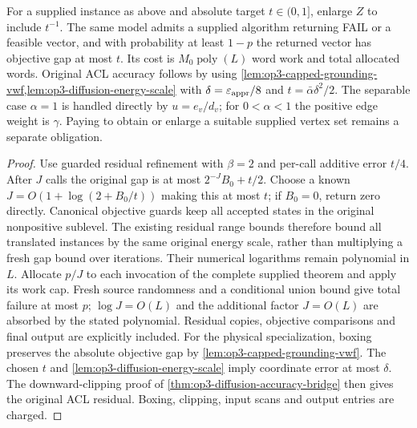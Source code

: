 \begin{corollary}
\label{cor:op3-complete-supplied-absolute}
For a supplied instance as above and absolute target $t\in(0,1]$, enlarge
$Z$ to include $t^{-1}$. The same model admits a supplied algorithm
returning \textnormal{FAIL} or a feasible vector, and with probability
at least $1-p$ the returned vector has objective gap at most $t$.
Its cost is $M_0\operatorname{poly}(L)$ word work and total
allocated words. Original ACL accuracy follows by using
\cref{lem:op3-capped-grounding-vwf,lem:op3-diffusion-energy-scale}
with $\delta=\varepsilon_{\mathrm{appr}}/8$ and $t=\bar\alpha\delta^2/2$.
The separable case $\alpha=1$ is handled directly by $u=e_v/d_v$;
for $0<\alpha<1$ the positive edge weight is $\gamma$.
Paying to obtain or enlarge a suitable supplied vertex set remains a
separate obligation.
\end{corollary}
\begin{proof}
Use guarded residual refinement with $\beta=2$ and per-call additive
error $t/4$. After $J$ calls the original gap is at most
$2^{-J}B_0+t/2$. Choose a known
$J=O(1+\log(2+B_0/t))$ making this at most $t$; if $B_0=0$, return
zero directly. Canonical objective guards keep all accepted states in
the original nonpositive sublevel. The existing residual range bounds
therefore bound all translated instances by the same original energy
scale, rather than multiplying a fresh gap bound over iterations.
Their numerical logarithms remain polynomial in $L$.
Allocate $p/J$ to each invocation of the complete supplied theorem and
apply its work cap. Fresh source randomness and a conditional union
bound give total failure at most $p$; $\log J=O(L)$ and the additional
factor $J=O(L)$ are absorbed by the stated polynomial. Residual copies,
objective comparisons and final output are explicitly included.
For the physical specialization, boxing preserves the absolute objective
gap by \cref{lem:op3-capped-grounding-vwf}. The chosen $t$ and
\cref{lem:op3-diffusion-energy-scale} imply coordinate error at most
$\delta$. The downward-clipping proof of
\cref{thm:op3-diffusion-accuracy-bridge} then gives the original ACL
residual. Boxing, clipping, input scans and output entries are charged.
\end{proof}

